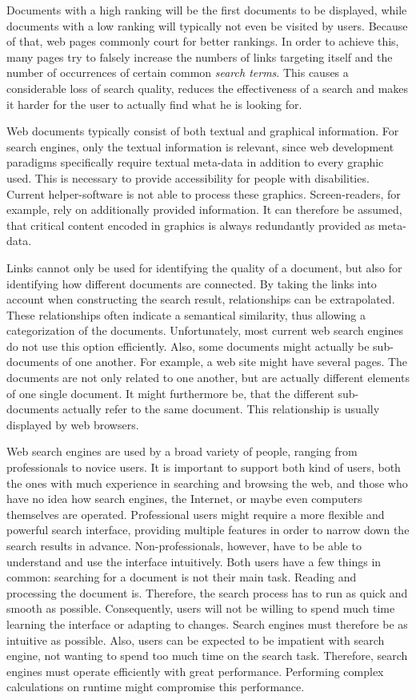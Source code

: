 Documents with a high ranking will be the first documents to be displayed, while documents with a low ranking will typically not even be visited by users. Because of that, web pages commonly court for better rankings. In order to achieve this, many pages try to falsely increase the numbers of links targeting itself and the number of occurrences of certain common \emph{search terms}. This causes a considerable loss of search quality, reduces the effectiveness of a search and makes it harder for the user to actually find what he is looking for.

Web documents typically consist of both textual and graphical information. For search engines, only the textual information is relevant, since web development paradigms specifically require textual meta-data in addition to every graphic used. This is necessary to provide accessibility for people with disabilities. Current helper-software is not able to process these graphics. Screen-readers, for example, rely on additionally provided information. It can therefore be assumed, that critical content encoded in graphics is always redundantly provided as meta-data.

Links cannot only be used for identifying the quality of a document, but also for identifying how different documents are connected. By taking the links into account when constructing the search result, relationships can be extrapolated. These relationships often indicate a semantical similarity, thus allowing a categorization of the documents. Unfortunately, most current web search engines do not use this option efficiently. Also, some documents might actually be sub-documents of one another. For example, a web site might have several pages. The documents are not only related to one another, but are actually different elements of one single document. It might furthermore be, that the different sub-documents actually refer to the same document. This relationship is usually displayed by web browsers.

Web search engines are used by a broad variety of people, ranging from professionals to novice users. It is important to support both kind of users, both the ones with much experience in searching and browsing the web, and those who have no idea how search engines, the Internet, or maybe even computers themselves are operated. Professional users might require a more flexible and powerful search interface, providing multiple features in order to narrow down the search results in advance. Non-professionals, however, have to be able to understand and use the interface intuitively. Both users have a few things in common: searching for a document is not their main task. Reading and processing the document is. Therefore, the search process has to run as quick and smooth as possible. Consequently, users will not be willing to spend much time learning the interface or adapting to changes. Search engines must therefore be as intuitive as possible. Also, users can be expected to be impatient with search engine, not wanting to spend too much time on the search task. Therefore, search engines must operate efficiently with great performance. Performing complex calculations on runtime might compromise this performance.